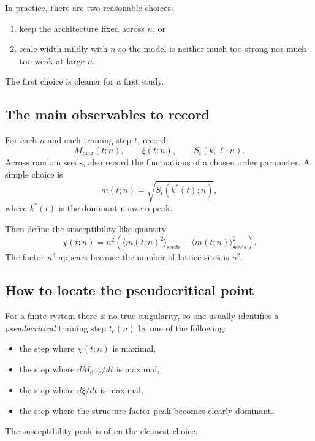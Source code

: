 \documentclass[11pt]{article}
\newcommand{\diag}{\mathrm{diag}}
\begin{document}
In practice, there are two reasonable choices:
\begin{enumerate}
    \item keep the architecture fixed across $n$, or
    \item scale width mildly with $n$ so the model is neither much too strong nor much too weak at large $n$.
\end{enumerate}
The first choice is cleaner for a first study.

\subsection{The main observables to record}

For each $n$ and each training step $t$, record:
\begin{equation}
    M_{\diag}(t;n), \qquad \xi(t;n), \qquad S_t(k,\ell;n).
\end{equation}
Across random seeds, also record the fluctuations of a chosen order parameter. A simple choice is
\begin{equation}
    m(t;n) = \sqrt{S_t(k^*(t);n)},
\end{equation}
where $k^*(t)$ is the dominant nonzero peak.

Then define the susceptibility-like quantity
\begin{equation}
    \chi(t;n) = n^2 \left( \langle m(t;n)^2 \rangle_{\text{seeds}} - \langle m(t;n) \rangle_{\text{seeds}}^2 \right).
\end{equation}
The factor $n^2$ appears because the number of lattice sites is $n^2$.

\subsection{How to locate the pseudocritical point}

For a finite system there is no true singularity, so one usually identifies a \emph{pseudocritical} training step $t_c(n)$ by one of the following:
\begin{itemize}
    \item the step where $\chi(t;n)$ is maximal,
    \item the step where $dM_{\diag}/dt$ is maximal,
    \item the step where $d\xi/dt$ is maximal,
    \item the step where the structure-factor peak becomes clearly dominant.
\end{itemize}
The susceptibility peak is often the cleanest choice.
\end{document}
